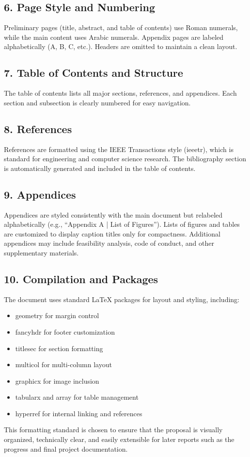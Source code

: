 \subsection*{6. Page Style and Numbering}
Preliminary pages (title, abstract, and table of contents) use Roman numerals, while the main content uses Arabic numerals. Appendix pages are labeled alphabetically (A, B, C, etc.). Headers are omitted to maintain a clean layout.
\subsection*{7. Table of Contents and Structure}
The table of contents lists all major sections, references, and appendices. Each section and subsection is clearly numbered for easy navigation.
\subsection*{8. References}
References are formatted using the IEEE Transactions style (ieeetr), which is standard for engineering and computer science research. The bibliography section is automatically generated and included in the table of contents.
\subsection*{9. Appendices}
Appendices are styled consistently with the main document but relabeled alphabetically (e.g., “Appendix A | List of Figures”). Lists of figures and tables are customized to display caption titles only for compactness. Additional appendices may include feasibility analysis, code of conduct, and other supplementary materials.
\item
\subsection*{10. Compilation and Packages}
The document uses standard LaTeX packages for layout and styling, including:
\begin{itemize}
    \item
    geometry for margin control
    \item
    fancyhdr for footer customization
    \item
    titlesec for section formatting
    \item
    multicol for multi-column layout
    \item
    graphicx for image inclusion
    \item
    tabularx and array for table management
    \item
    hyperref for internal linking and references
    \end{itemize}

This formatting standard is chosen to ensure that the proposal is visually organized, technically clear, and easily extensible for later reports such as the progress and final project documentation.